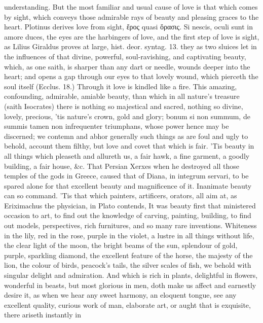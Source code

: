 {understanding.
But the most familiar and usual cause of love is that which comes by
sight, which conveys those admirable rays of beauty and pleasing graces
to the heart. Plotinus derives love from sight, ἔρος quasi ὅρασις.
Si nescis, oculi sunt in amore duces, the eyes are the harbingers
of love, and the first step of love is sight, as Lilius Giraldus
proves at large, hist. deor. syntag. 13. they as two sluices let in the
influences of that divine, powerful, soul-ravishing, and captivating
beauty, which, as one saith, is sharper than any dart or needle,
wounds deeper into the heart; and opens a gap through our eyes to that
lovely wound, which pierceth the soul itself (Ecclus. 18.) Through it
love is kindled like a fire. This amazing, confounding, admirable,
amiable beauty, than which in all nature's treasure (saith
Isocrates) there is nothing so majestical and sacred, nothing so
divine, lovely, precious, 'tis nature's crown, gold and glory; bonum si
non summum, de summis tamen non infrequenter triumphans, whose power
hence may be discerned; we contemn and abhor generally such things as
are foul and ugly to behold, account them filthy, but love and covet
that which is fair. 'Tis  beauty in all things which pleaseth and
allureth us, a fair hawk, a fine garment, a goodly building, a fair
house, \&c. That Persian Xerxes when he destroyed all those temples of
the gods in Greece, caused that of Diana, in integrum servari, to be
spared alone for that excellent beauty and magnificence of it.
Inanimate beauty can so command. 'Tis that which painters, artificers,
orators, all aim at, as Eriximachus the physician, in Plato contends,
It was beauty first that ministered occasion to art, to find out
the knowledge of carving, painting, building, to find out models,
perspectives, rich furnitures, and so many rare inventions. Whiteness
in the lily, red in the rose, purple in the violet, a lustre in all
things without life, the clear light of the moon, the bright beams of
the sun, splendour of gold, purple, sparkling diamond, the excellent
feature of the horse, the majesty of the lion, the colour of birds,
peacock's tails, the silver scales of fish, we behold with singular
delight and admiration. And which is rich in plants, delightful
in flowers, wonderful in beasts, but most glorious in men, doth make us
affect and earnestly desire it, as when we hear any sweet harmony, an
eloquent tongue, see any excellent quality, curious work of man,
elaborate art, or aught that is exquisite, there ariseth instantly in
}
